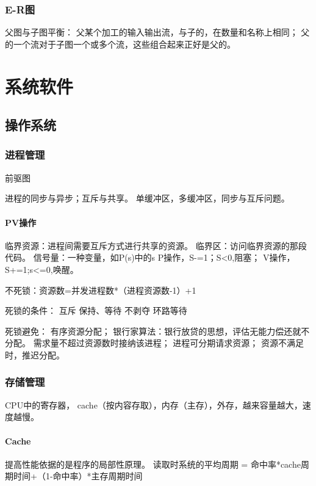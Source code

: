 \documentclass[UTF8]{../computerUniverse}
\begin{document}
\subsection{E-R图}
父图与子图平衡：
父某个加工的输入输出流，与子的，在数量和名称上相同；
父的一个流对于子图一个或多个流，这些组合起来正好是父的。














\chapter{系统软件}

\section{操作系统}

\subsection{进程管理}
前驱图

进程的同步与异步；互斥与共享。
单缓冲区，多缓冲区，同步与互斥问题。

\subsubsection{PV操作}
临界资源：进程间需要互斥方式进行共享的资源。
临界区：访问临界资源的那段代码。
信号量：一种变量，如P(s)中的s
P操作，S-=1；S<0,阻塞；
V操作，S+=1;s<=0,唤醒。


不死锁：资源数=并发进程数*（进程资源数-1）+1

死锁的条件：
互斥
保持、等待
不剥夺
环路等待

死锁避免：
有序资源分配；
银行家算法：银行放贷的思想，评估无能力偿还就不分配。
需求量不超过资源数时接纳该进程；
进程可分期请求资源；
资源不满足时，推迟分配。


\subsection{存储管理}



CPU中的寄存器， cache（按内容存取），内存（主存），外存，越来容量越大，速度越慢。

\subsubsection{Cache}
提高性能依据的是程序的局部性原理。
读取时系统的平均周期 = 命中率*cache周期时间+（1-命中率）*主存周期时间
\end{document}
